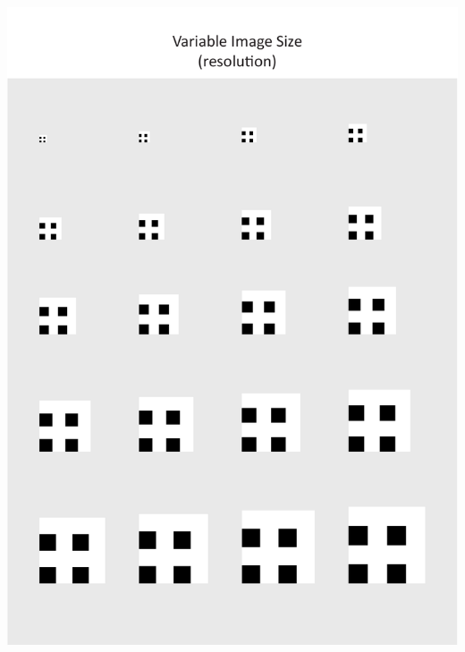 \documentclass[
  12pt,
  a4paper, twoside]{book}
\begin{document}
\begin{center}\includegraphics[width=1\linewidth]{Appendix/size_res} \end{center}

\newpage
\end{document}
